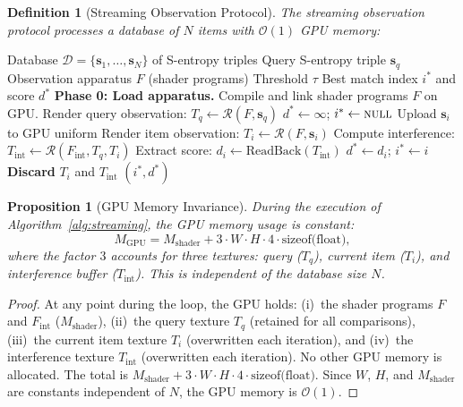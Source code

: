 \documentclass[11pt,twocolumn,a4paper]{article}
\newtheorem{proposition}[theorem]{Proposition}
\newtheorem{definition}[theorem]{Definition}
\newcommand{\BigO}{\mathcal{O}}
\newcommand{\Rend}{\mathcal{R}}
\newcommand{\Mgpu}{M_{\mathrm{GPU}}}
\newcommand{\Mshader}{M_{\mathrm{shader}}}
\begin{document}
\begin{definition}[Streaming Observation Protocol]
\label{def:streaming-protocol}
The streaming observation protocol processes a database of $N$ items
with $\BigO(1)$ GPU memory:
\end{definition}

\begin{algorithm}[H]
\caption{Streaming Observation Protocol}
\label{alg:streaming}
\begin{algorithmic}[1]
\Require Database $\mathcal{D} = \{\bm{s}_1, \ldots, \bm{s}_N\}$
  of S-entropy triples
\Require Query S-entropy triple $\bm{s}_q$
\Require Observation apparatus $F$ (shader programs)
\Require Threshold $\tau$
\Ensure Best match index $i^*$ and score $d^*$
\State \textbf{Phase 0: Load apparatus.}
  Compile and link shader programs $F$ on GPU.
\State Render query observation:
  $T_q \gets \Rend(F, \bm{s}_q)$
  \Comment{$\BigO(1)$, one draw call}
\State $d^* \gets \infty$; $i^* \gets \textsc{null}$
  \State Upload $\bm{s}_i$ to GPU uniform
  \State Render item observation:
    $T_i \gets \Rend(F, \bm{s}_i)$
    \Comment{$\BigO(1)$}
  \State Compute interference:
    $T_{\mathrm{int}} \gets \Rend(F_{\mathrm{int}}, T_q, T_i)$
    \Comment{$\BigO(1)$}
  \State Extract score:
    $d_i \gets \text{ReadBack}(T_{\mathrm{int}})$
    \Comment{$\BigO(1)$}
    \State $d^* \gets d_i$; $i^* \gets i$
  \EndIf
  \State \textbf{Discard} $T_i$ and $T_{\mathrm{int}}$
\EndFor
\State \Return $(i^*, d^*)$
\end{algorithmic}
\end{algorithm}

\begin{proposition}[GPU Memory Invariance]
\label{prop:memory-invariance}
During the execution of Algorithm~\ref{alg:streaming}, the GPU
memory usage is constant:
\begin{equation}
\Mgpu = \Mshader + 3 \cdot W \cdot H \cdot 4 \cdot
  \text{sizeof(float)},
\label{eq:Mgpu}
\end{equation}
where the factor $3$ accounts for three textures: query ($T_q$),
current item ($T_i$), and interference buffer ($T_{\mathrm{int}}$).
This is independent of the database size $N$.
\end{proposition}

\begin{proof}
At any point during the loop, the GPU holds: (i)~the shader programs
$F$ and $F_{\mathrm{int}}$ ($\Mshader$), (ii)~the query texture $T_q$
(retained for all comparisons), (iii)~the current item texture $T_i$
(overwritten each iteration), and (iv)~the interference texture
$T_{\mathrm{int}}$ (overwritten each iteration). No other GPU memory
is allocated. The total is $\Mshader + 3 \cdot W \cdot H \cdot 4
\cdot \text{sizeof(float)}$. Since $W$, $H$, and $\Mshader$ are
constants independent of $N$, the GPU memory is $\BigO(1)$.
\end{proof}
\end{document}
